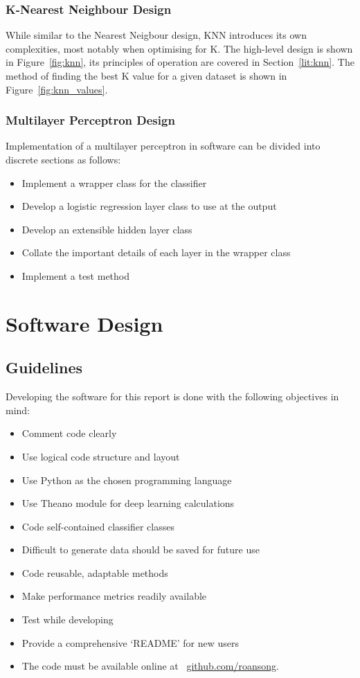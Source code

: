 \subsubsection{K-Nearest Neighbour Design}
While similar to the Nearest Neigbour design, 
KNN introduces its own complexities, most notably when optimising for K. The high-level design is shown in Figure~\ref{fig:knn}, its principles of operation are covered in Section~\ref{lit:knn}. The method of finding the best K value for a given dataset is shown in Figure~\ref{fig:knn_values}.




\subsubsection{Multilayer Perceptron Design}

Implementation of a multilayer perceptron in software can be divided into discrete sections as follows:
\begin{itemize}
	\item Implement a wrapper class for the classifier
	\item Develop a logistic regression layer class to use at the output
	\item Develop an extensible hidden layer class
	\item Collate the important details of each layer in the wrapper class
	\item Implement a test method
\end{itemize}

\section{Software Design}
\subsection{Guidelines}
Developing the software for this report is done with the following objectives in mind:
\begin{itemize}
	\item Comment code clearly
	\item Use logical code structure and layout
	\item Use Python as the chosen programming language
	\item Use Theano module for deep learning calculations
	\item Code self-contained classifier classes
	\item Difficult to generate data should be saved for future use
	\item Code reusable, adaptable methods
	\item Make performance metrics readily available
	\item Test while developing
	\item Provide a comprehensive `README' for new users
	\item The code must be available online at ~\href{http://github.com/roansong}{github.com/roansong}.
\end{itemize}


